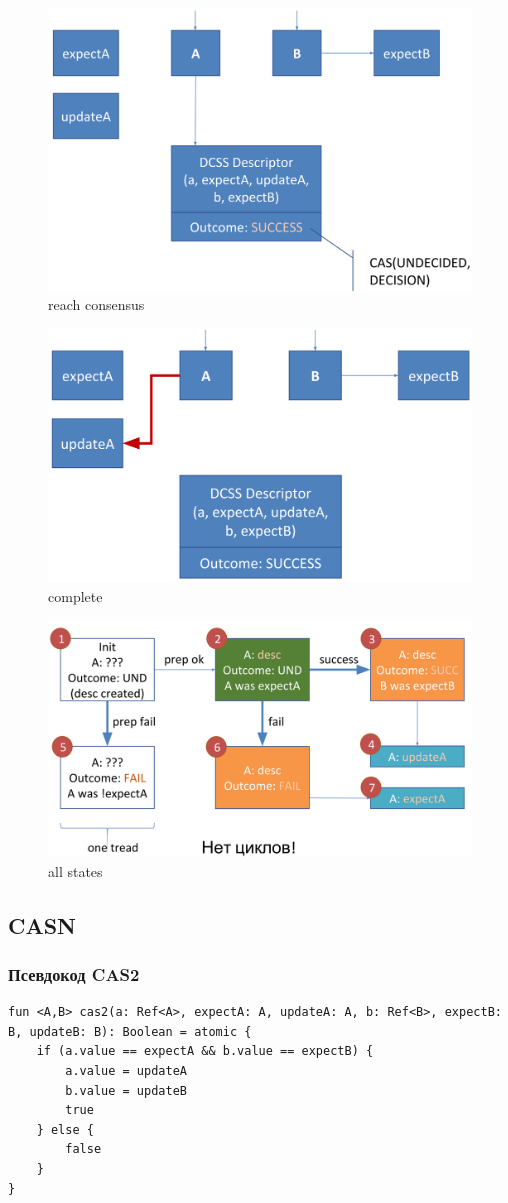 \documentclass[10pt,a4paper,oneside,titlepage]{article}
\theoremstyle{plain}
\theoremstyle{defenition}
\begin{document}
\begin{figure}[h!]
	\centering
	\includegraphics[width=0.4\linewidth]{pictures/DCSSM4}
	\caption{reach consensus}
	\label{fig:dcssm4}
\end{figure}

\begin{figure}[h!]
	\centering
	\includegraphics[width=0.4\linewidth]{pictures/DCSSM5}
	\caption{complete}
	\label{fig:dcssm5}
\end{figure}

\begin{figure}[h!]
	\centering
	\includegraphics[width=0.5\linewidth]{pictures/DCSSM6}
	\caption{all states}
	\label{fig:dcssm6}
\end{figure}

\subsection{CASN}

\subsubsection{Псевдокод CAS2}

\begin{lstlisting}
fun <A,B> cas2(a: Ref<A>, expectA: A, updateA: A, b: Ref<B>, expectB: B, updateB: B): Boolean = atomic {
    if (a.value == expectA && b.value == expectB) {
        a.value = updateA
        b.value = updateB
        true
    } else {
        false
    }
}
\end{lstlisting}
\end{document}

